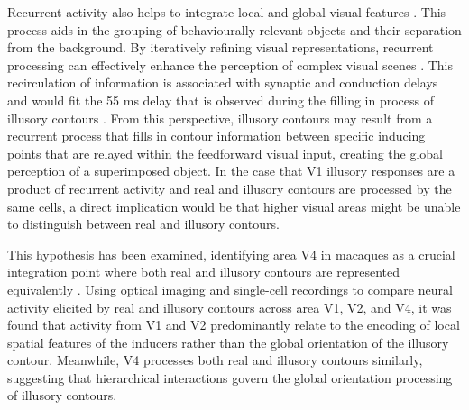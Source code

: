 \documentclass[12pt]{article}
\begin{document}
Recurrent activity also helps to integrate local and global visual features \autocite{wyatteEarlyRecurrentFeedback2014}. This process aids in the grouping of behaviourally relevant objects and their separation from the background. By iteratively refining visual representations, recurrent processing can effectively enhance the perception of complex visual scenes \autocite{roelfsemaCORTICALALGORITHMSPERCEPTUAL2006,shushruthStrongRecurrentNetworks2012}. This recirculation of information is associated with synaptic and conduction delays and would fit the 55 ms delay that is observed during the filling in process of illusory contours \autocite{leeDynamicsSubjectiveContour2001,pakTopDownFeedbackControls2020}. From this perspective, illusory contours may result from a recurrent process that fills in contour information between specific inducing points that are relayed within the feedforward visual input, creating the global perception of a superimposed object. In the case that V1 illusory responses are a product of recurrent activity and real and illusory contours are processed by the same cells, a direct implication would be that higher visual areas might be unable to distinguish between real and illusory contours.

\bigbreak
This hypothesis has been examined, identifying area V4 in macaques as a crucial integration point where both real and illusory contours are represented equivalently \autocite{panEquivalentRepresentationReal2012}. Using optical imaging and single-cell recordings to compare neural activity elicited by real and illusory contours across area V1, V2, and V4, it was found that activity from V1 and V2 predominantly relate to the encoding of local spatial features of the inducers rather than the global orientation of the illusory contour. Meanwhile, V4 processes both real and illusory contours similarly, suggesting that hierarchical interactions govern the global orientation processing of illusory contours. 
\end{document}
